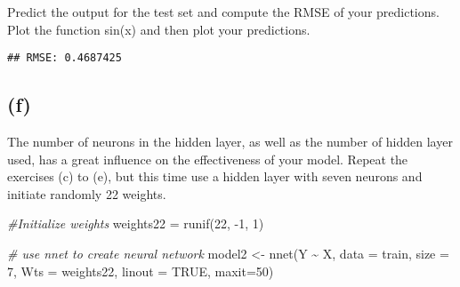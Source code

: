 \documentclass[
]{article}
\newenvironment{Shaded}{\begin{snugshade}}{\end{snugshade}}
\newcommand{\AttributeTok}[1]{\textcolor[rgb]{0.77,0.63,0.00}{#1}}
\newcommand{\CommentTok}[1]{\textcolor[rgb]{0.56,0.35,0.01}{\textit{#1}}}
\newcommand{\ConstantTok}[1]{\textcolor[rgb]{0.00,0.00,0.00}{#1}}
\newcommand{\DecValTok}[1]{\textcolor[rgb]{0.00,0.00,0.81}{#1}}
\newcommand{\FunctionTok}[1]{\textcolor[rgb]{0.00,0.00,0.00}{#1}}
\newcommand{\NormalTok}[1]{#1}
\newcommand{\OtherTok}[1]{\textcolor[rgb]{0.56,0.35,0.01}{#1}}
\newcommand{\SpecialCharTok}[1]{\textcolor[rgb]{0.00,0.00,0.00}{#1}}
\newcommand{\StringTok}[1]{\textcolor[rgb]{0.31,0.60,0.02}{#1}}
\begin{document}
Predict the output for the test set and compute the RMSE of your
predictions. Plot the function sin(x) and then plot your predictions.

\begin{Shaded}
\end{Shaded}

\begin{verbatim}
## RMSE: 0.4687425
\end{verbatim}

\hypertarget{f}{%
\subsection{(f)}\label{f}}

The number of neurons in the hidden layer, as well as the number of
hidden layer used, has a great influence on the effectiveness of your
model. Repeat the exercises (c) to (e), but this time use a hidden layer
with seven neurons and initiate randomly 22 weights.

\begin{Shaded}
\begin{Highlighting}[]
\CommentTok{\#Initialize weights}
\NormalTok{weights22 }\OtherTok{=} \FunctionTok{runif}\NormalTok{(}\DecValTok{22}\NormalTok{, }\SpecialCharTok{{-}}\DecValTok{1}\NormalTok{, }\DecValTok{1}\NormalTok{)}

\CommentTok{\# use nnet to create neural network}
\NormalTok{model2 }\OtherTok{\textless{}{-}} \FunctionTok{nnet}\NormalTok{(Y }\SpecialCharTok{\textasciitilde{}}\NormalTok{ X, }\AttributeTok{data =}\NormalTok{ train, }\AttributeTok{size =} \DecValTok{7}\NormalTok{, }\AttributeTok{Wts =}\NormalTok{ weights22, }\AttributeTok{linout =} \ConstantTok{TRUE}\NormalTok{, }\AttributeTok{maxit=}\DecValTok{50}\NormalTok{)}
\end{Highlighting}
\end{Shaded}
\end{document}
